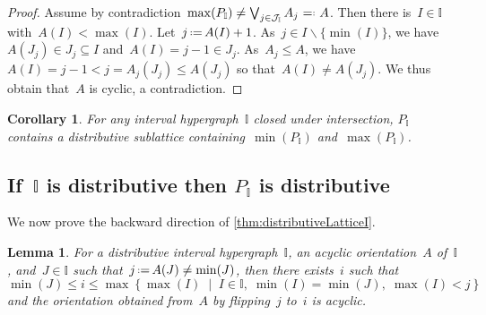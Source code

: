 \documentclass[reqno]{amsart}
\newtheorem{corollary}[theorem]{Corollary}
\newtheorem{lemma}[theorem]{Lemma}
\theoremstyle{definition}
\newcommand{\cal}[1]{\mathcal{#1}} %
\newcommand{\set}[2]{\left\{ #1 \;\middle|\; #2 \right\}} %
\newcommand{\ssm}{\smallsetminus} %
\newcommand{\eqdef}{\mbox{\,\raisebox{0.2ex}{\scriptsize\ensuremath{\mathrm:}}\ensuremath{=}\,}} %
\newcommand{\defeq}{\mbox{~\ensuremath{=}\raisebox{0.2ex}{\scriptsize\ensuremath{\mathrm:}} }} %
\newcommand{\bigJoin}{\bigvee} %
\newcommand{\II}{\mathbb I} %
\newcommand{\cJ}{\cal{J}} %
\begin{document}
\begin{proof}
Assume by contradiction~$\max(P_\II) \ne \bigJoin_{j \in \cJ_\II} A_j \defeq A$.
Then there is~$I \in \II$ with~${A(I) < \max(I)}$.
Let~$j \eqdef A(I) + 1$.
As~$j \in I \ssm \{\min(I)\}$, we have~$A(J_j) \in J_j \subseteq I$ and~$A(I) = j-1 \in J_j$.
As~$A_j \le A$, we have~$A(I) = j-1 < j = A_j(J_j) \le A(J_j)$ so that~$A(I) \ne A(J_j)$.
We thus obtain that~$A$ is cyclic, a contradiction.
\end{proof}

\begin{corollary}
For any interval hypergraph~$\II$ closed under intersection, $P_\II$ contains a distributive sublattice containing~$\min(P_\II)$ and~$\max(P_\II)$.
\end{corollary}


\subsection{If~$\II$ is distributive then $P_\II$ is distributive}
\label{subsec:distributiveLatticeBackward}

We now prove the backward direction of \cref{thm:distributiveLatticeI}.

\begin{lemma}
\label{lem:alwaysFlippable}
For a distributive interval hypergraph~$\II$, an acyclic orientation~$A$ of~$\II$, and~$J \in \II$ such that~$j \eqdef A(J) \ne \min(J)$, then there exists~$i$ such that
\[
\min(J) \le i \le \max\set{\max(I)}{I \in \II, \; \min(I) = \min(J), \; \max(I) < j}
\]
and the orientation obtained from~$A$ by flipping~$j$ to~$i$ is acyclic.
\end{lemma}
\end{document}
